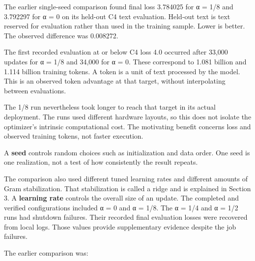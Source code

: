 \documentclass[
  14pt,
  letterpaper,
]{extarticle}
\begin{document}
The earlier single-seed comparison found final loss 3.784025 for α = 1/8
and 3.792297 for α = 0 on its held-out C4 text evaluation. Held-out text
is text reserved for evaluation rather than used in the training sample.
Lower is better. The observed difference was 0.008272.

The first recorded evaluation at or below C4 loss 4.0 occurred after
33,000 updates for α = 1/8 and 34,000 for α = 0. These correspond to
1.081 billion and 1.114 billion training tokens. A token is a unit of
text processed by the model. This is an observed token advantage at that
target, without interpolating between evaluations.

The 1/8 run nevertheless took longer to reach that target in its actual
deployment. The runs used different hardware layouts, so this does not
isolate the optimizer's intrinsic computational cost. The motivating
benefit concerns loss and observed training tokens, not faster
execution.

A \textbf{seed} controls random choices such as initialization and data
order. One seed is one realization, not a test of how consistently the
result repeats.

The comparison also used different tuned learning rates and different
amounts of Gram stabilization. That stabilization is called a ridge and
is explained in Section 3. A \textbf{learning rate} controls the overall
size of an update. The completed and verified configurations included α
= 0 and α = 1/8. The α = 1/4 and α = 1/2 runs had shutdown failures.
Their recorded final evaluation losses were recovered from local logs.
Those values provide supplementary evidence despite the job failures.

The earlier comparison was:
\end{document}
